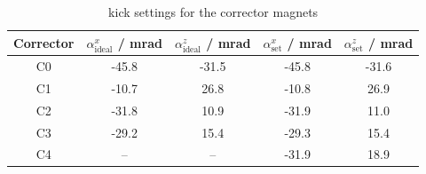\documentclass[11pt,a4paper,notitlepage]{scrartcl}
\begin{document}
\begin{table}[H]
	\centering
	\begin{tabular}{|c|c|c|c|c|}
		\hline
		Corrector&$\alpha^x_\text{ideal}$ / mrad &$\alpha^z_\text{ideal}$ / mrad &$\alpha^x_\text{set}$ / mrad &$\alpha^z_\text{set}$ / mrad  \\
		\hline
		C0&  -45.8 & -31.5&-45.8&-31.6\\
		C1& -10.7& 26.8 &-10.8&26.9\\
		C2&  -31.8 & 10.9&-31.9&11.0\\
		C3& -29.2& 15.4 &-29.3&15.4\\
		C4 &--&--&-31.9&18.9\\
		\hline
	\end{tabular}
	\caption{kick settings for the corrector magnets}\label{tab:kick_settings}
\end{table}
\end{document}
